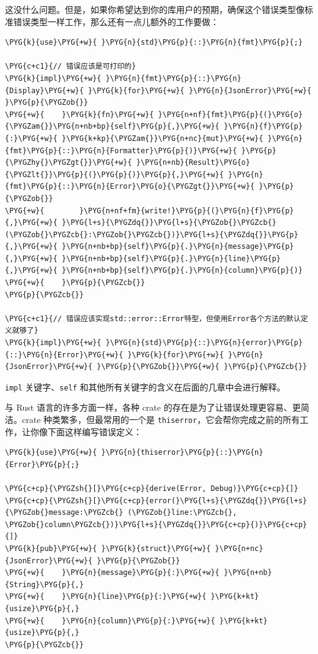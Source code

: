 这没什么问题。但是，如果你希望达到你的库用户的预期，确保这个错误类型像标准错误类型一样工作，那么还有一点儿额外的工作要做：

\begin{Verbatim}[commandchars=\\\{\},breaklines=true,breakanywhere=true,fontsize=\codefont,xleftmargin=17bp]
\PYG{k}{use}\PYG{+w}{ }\PYG{n}{std}\PYG{p}{::}\PYG{n}{fmt}\PYG{p}{;}

\PYG{c+c1}{// 错误应该是可打印的}
\PYG{k}{impl}\PYG{+w}{ }\PYG{n}{fmt}\PYG{p}{::}\PYG{n}{Display}\PYG{+w}{ }\PYG{k}{for}\PYG{+w}{ }\PYG{n}{JsonError}\PYG{+w}{ }\PYG{p}{\PYGZob{}}
\PYG{+w}{    }\PYG{k}{fn}\PYG{+w}{ }\PYG{n+nf}{fmt}\PYG{p}{(}\PYG{o}{\PYGZam{}}\PYG{n+nb+bp}{self}\PYG{p}{,}\PYG{+w}{ }\PYG{n}{f}\PYG{p}{:}\PYG{+w}{ }\PYG{k+kp}{\PYGZam{}}\PYG{n+nc}{mut}\PYG{+w}{ }\PYG{n}{fmt}\PYG{p}{::}\PYG{n}{Formatter}\PYG{p}{)}\PYG{+w}{ }\PYG{p}{\PYGZhy{}\PYGZgt{}}\PYG{+w}{ }\PYG{n+nb}{Result}\PYG{o}{\PYGZlt{}}\PYG{p}{(}\PYG{p}{)}\PYG{p}{,}\PYG{+w}{ }\PYG{n}{fmt}\PYG{p}{::}\PYG{n}{Error}\PYG{o}{\PYGZgt{}}\PYG{+w}{ }\PYG{p}{\PYGZob{}}
\PYG{+w}{        }\PYG{n+nf+fm}{write!}\PYG{p}{(}\PYG{n}{f}\PYG{p}{,}\PYG{+w}{ }\PYG{l+s}{\PYGZdq{}}\PYG{l+s}{\PYGZob{}\PYGZcb{} (\PYGZob{}\PYGZcb{}:\PYGZob{}\PYGZcb{})}\PYG{l+s}{\PYGZdq{}}\PYG{p}{,}\PYG{+w}{ }\PYG{n+nb+bp}{self}\PYG{p}{.}\PYG{n}{message}\PYG{p}{,}\PYG{+w}{ }\PYG{n+nb+bp}{self}\PYG{p}{.}\PYG{n}{line}\PYG{p}{,}\PYG{+w}{ }\PYG{n+nb+bp}{self}\PYG{p}{.}\PYG{n}{column}\PYG{p}{)}
\PYG{+w}{    }\PYG{p}{\PYGZcb{}}
\PYG{p}{\PYGZcb{}}

\PYG{c+c1}{// 错误应该实现std::error::Error特型，但使用Error各个方法的默认定义就够了}
\PYG{k}{impl}\PYG{+w}{ }\PYG{n}{std}\PYG{p}{::}\PYG{n}{error}\PYG{p}{::}\PYG{n}{Error}\PYG{+w}{ }\PYG{k}{for}\PYG{+w}{ }\PYG{n}{JsonError}\PYG{+w}{ }\PYG{p}{\PYGZob{}}\PYG{+w}{ }\PYG{p}{\PYGZcb{}}
\end{Verbatim}

\texttt{impl} 关键字、\texttt{self} 和其他所有关键字的含义在后面的几章中会进行解释。

与 Rust 语言的许多方面一样，各种 crate 的存在是为了让错误处理更容易、更简洁。crate 种类繁多，但最常用的一个是 \texttt{thiserror}，它会帮你完成之前的所有工作，让你像下面这样编写错误定义：

\begin{Verbatim}[commandchars=\\\{\},breaklines=true,breakanywhere=true,fontsize=\codefont,xleftmargin=17bp]
\PYG{k}{use}\PYG{+w}{ }\PYG{n}{thiserror}\PYG{p}{::}\PYG{n}{Error}\PYG{p}{;}

\PYG{c+cp}{\PYGZsh{}[}\PYG{c+cp}{derive(Error, Debug)}\PYG{c+cp}{]}
\PYG{c+cp}{\PYGZsh{}[}\PYG{c+cp}{error(}\PYG{l+s}{\PYGZdq{}}\PYG{l+s}{\PYGZob{}message:\PYGZcb{} (\PYGZob{}line:\PYGZcb{}, \PYGZob{}column\PYGZcb{})}\PYG{l+s}{\PYGZdq{}}\PYG{c+cp}{)}\PYG{c+cp}{]}
\PYG{k}{pub}\PYG{+w}{ }\PYG{k}{struct}\PYG{+w}{ }\PYG{n+nc}{JsonError}\PYG{+w}{ }\PYG{p}{\PYGZob{}}
\PYG{+w}{    }\PYG{n}{message}\PYG{p}{:}\PYG{+w}{ }\PYG{n+nb}{String}\PYG{p}{,}
\PYG{+w}{    }\PYG{n}{line}\PYG{p}{:}\PYG{+w}{ }\PYG{k+kt}{usize}\PYG{p}{,}
\PYG{+w}{    }\PYG{n}{column}\PYG{p}{:}\PYG{+w}{ }\PYG{k+kt}{usize}\PYG{p}{,}
\PYG{p}{\PYGZcb{}}
\end{Verbatim}

